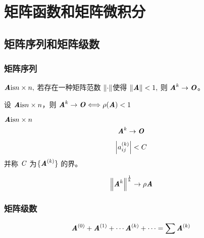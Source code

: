 \chapter{矩阵函数和矩阵微积分}
\label{cha:矩阵函数和矩阵微积分}


\section{矩阵序列和矩阵级数}
\label{sec:矩阵序列和矩阵级数}

\subsection{矩阵序列}
\label{sub:矩阵序列}

\begin{lemma}
    $\MA \text{is} n \times n,$ 若存在一种矩阵范数 $\norm{\cdot}$使得 $\norm{\MA} < 1,$ 则 $\MA^k \to \MO$。
\end{lemma}

\begin{theorem}
    设 $\MA \text{is} n \times n$，则 $\MA^k \to \MO \Longleftrightarrow \rho(\MA) < 1$
\end{theorem}

\begin{definition}[收敛矩阵]
    $\MA \text{is} n \times n$ \\
    \[
        \MA^k \to \MO
    \]
\end{definition}

\begin{definition}[界]
    \[
        \abs{a_{ij}^{(k)}} < C
    \]
    并称 $\SC$ 为$\{ \MA^{(k)} \}$ 的界。
\end{definition}

\begin{inference}
    \[
        \norm{\MA^k}^{\frac 1k} \to \rho{\MA}
    \]
\end{inference}

\subsection{矩阵级数}
\label{sub:矩阵级数}

\begin{definition}[矩阵级数]
    \[
        \MA^{(0)} + \MA^{(1)} + \cdots \MA^{(k)} + \cdots = \sum \MA^{(k)}
    \]
\end{definition}

